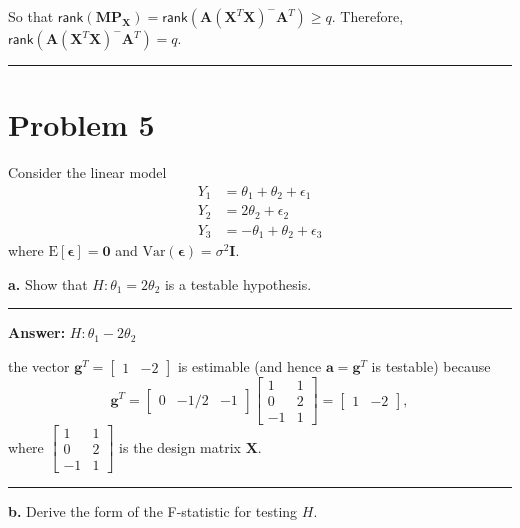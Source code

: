 \documentclass[
]{article}
\newcommand{\bmA}{\ensuremath{\bm A}}
\newcommand{\bma}{\ensuremath{\bm a}}
\newcommand{\bmg}{\ensuremath{\bm g}}
\newcommand{\bmI}{\ensuremath{\bm I}}
\newcommand{\bmM}{\ensuremath{\bm M}}
\newcommand{\bmP}{\ensuremath{\bm P}}
\newcommand{\bmX}{\ensuremath{\bm X}}
\newcommand{\bmepsilon}{\ensuremath{\bm{\epsilon}}}
\newcommand{\rank}{\ensuremath{\mathsf{rank}}}
\newcommand{\E}{\ensuremath{\mathrm{E}}}
\newcommand{\Var}{\ensuremath{\mathrm{Var}}}
\begin{document}
So that
\(\rank(\bmM\bmP_{\bmX}) = \rank(\bmA(\bmX^T\bmX)^- \bmA^T) \ge q\).
Therefore, \(\rank(\bmA(\bmX^T\bmX)^- \bmA^T) = q\).

\begin{center}\rule{0.5\linewidth}{0.5pt}\end{center}

\hypertarget{problem-5}{%
\section{Problem 5}\label{problem-5}}

Consider the linear model \begin{align*}
Y_1 &= \theta_1 + \theta_2 + \epsilon_1\\
Y_2 &= 2\theta_2 + \epsilon_2\\
Y_3 &= -\theta_1 + \theta_2 + \epsilon_3
\end{align*} where \(\E[\bmepsilon] = \bm0\) and
\(\Var(\bmepsilon) = \sigma^2\bmI\).

\textbf{a.} Show that \(H : \theta_1 = 2\theta_2\) is a testable
hypothesis.

\begin{center}\rule{0.5\linewidth}{0.5pt}\end{center}

\textbf{Answer:} \(H : \theta_1 - 2\theta_2\)

the vector \(\bmg^T = \begin{bmatrix} 1 & -2 \end{bmatrix}\) is
estimable (and hence \(\bma = \bmg^T\) is testable) because \[
\bmg^T = \begin{bmatrix} 0 & -1/2 & -1 \end{bmatrix} \begin{bmatrix} 1 & 1 \\ 0 & 2 \\ -1 & 1\end{bmatrix} = \begin{bmatrix} 1 & -2 \end{bmatrix},
\] where \(\begin{bmatrix} 1 & 1 \\ 0 & 2 \\ -1 & 1\end{bmatrix}\) is
the design matrix \(\bmX\).

\begin{center}\rule{0.5\linewidth}{0.5pt}\end{center}

\textbf{b.} Derive the form of the F-statistic for testing \(H\).
\end{document}
